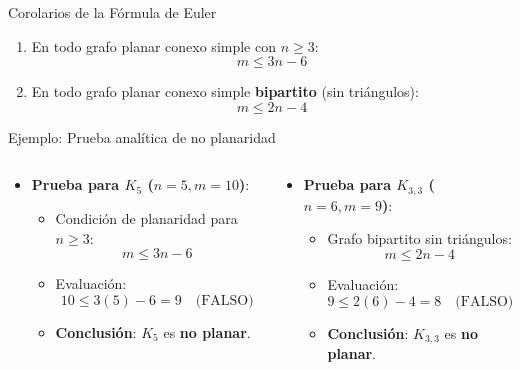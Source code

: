 \documentclass[
  ignorenonframetext,
]{beamer}
\providecommand{\tightlist}{%
  \setlength{\itemsep}{0pt}\setlength{\parskip}{0pt}}
\begin{document}
\begin{frame}{Corolarios de la Fórmula de Euler}
\label{corolarios-de-la-fuxf3rmula-de-euler}
\begin{tcolorbox}[enhanced jigsaw, left=2mm, opacityback=0, titlerule=0mm, breakable, toptitle=1mm, rightrule=.15mm, bottomtitle=1mm, coltitle=black, title=\textcolor{quarto-callout-note-color}{\faInfo}\hspace{0.5em}{Corolario: Desigualdades de planaridad}, colframe=quarto-callout-note-color-frame, colbacktitle=quarto-callout-note-color!10!white, arc=.35mm, toprule=.15mm, leftrule=.75mm, bottomrule=.15mm, opacitybacktitle=0.6, colback=white]

\begin{enumerate}
\tightlist
\item
  En todo grafo planar conexo simple con \(n \ge 3\): \[
  m \le 3n - 6
  \]
\item
  En todo grafo planar conexo simple \textbf{bipartito} (sin
  triángulos): \[
  m \le 2n - 4
  \]
\end{enumerate}

\end{tcolorbox}
\end{frame}

\begin{frame}{Ejemplo: Prueba analítica de no planaridad}
\label{ejemplo-prueba-analuxedtica-de-no-planaridad}
\begin{columns}[T]
\begin{column}{0.5\linewidth}
\begin{itemize}
\tightlist
\item
  \textbf{Prueba para \(K_5\) (\(n=5, m=10\))}:

  \begin{itemize}
  \tightlist
  \item
    Condición de planaridad para \(n \ge 3\): \[m \le 3n - 6\]
  \item
    Evaluación: \[10 \le 3(5) - 6 = 9 \quad \text{(FALSO)}\]
  \item
    \textbf{Conclusión}: \(K_5\) es \textbf{no planar}.
  \end{itemize}
\end{itemize}
\end{column}

\begin{column}{0.5\linewidth}
\begin{itemize}
\tightlist
\item
  \textbf{Prueba para \(K_{3,3}\) (\(n=6, m=9\))}:

  \begin{itemize}
  \tightlist
  \item
    Grafo bipartito sin triángulos: \[m \le 2n - 4\]
  \item
    Evaluación: \[9 \le 2(6) - 4 = 8 \quad \text{(FALSO)}\]
  \item
    \textbf{Conclusión}: \(K_{3,3}\) es \textbf{no planar}.
  \end{itemize}
\end{itemize}
\end{column}
\end{columns}
\end{frame}
\end{document}
